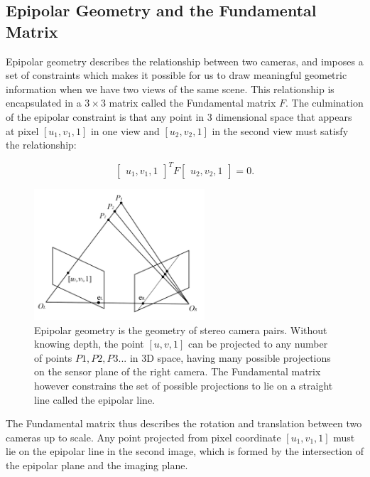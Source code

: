 \subsection{Epipolar Geometry and the Fundamental Matrix}

Epipolar geometry describes the relationship between two cameras, and imposes a set of constraints which makes it possible for us to draw meaningful geometric information when we have two views of the same scene. This relationship is encapsulated in a $3 \times 3$ matrix called the Fundamental matrix $F$. The culmination of the epipolar constraint is that any point in 3 dimensional space that appears at pixel $[u_1, v_1, 1]$ in one view and $[u_2, v_2, 1]$ in the second view must satisfy the relationship:

\begin{equation}
    \begin{bmatrix}
        u_1, v_1, 1
    \end{bmatrix}^T
    F
    \begin{bmatrix}
        u_2, v_2, 1
    \end{bmatrix}
    = 0.
\end{equation}

\begin{figure}
    \centering
    \includegraphics[width=2.5in]{images/epipolarplane.png}
    \caption[The fundamental matrix in epipolar geometry]{Epipolar geometry is the geometry of stereo camera pairs. Without knowing depth, the point $[u,v,1]$ can be projected to any number of points $P1, P2, P3... $ in 3D space, having many possible projections on the sensor plane of the right camera. The Fundamental matrix however constrains the set of possible projections to lie on a straight line called the epipolar line.}
    \label{epipolarplane}
\end{figure}

The Fundamental matrix thus describes the rotation and translation between two cameras up to scale. Any point projected from pixel coordinate $[u_1, v_1, 1]$ must lie on the epipolar line in the second image, which is formed by the intersection of the epipolar plane and the imaging plane. 


